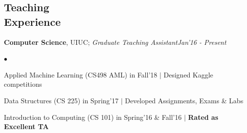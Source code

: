 \documentclass[margin,line]{res}
\newenvironment{list2}{
  \begin{list}{$\bullet$}{%
      \setlength{\itemsep}{0in}
      \setlength{\parsep}{0in} \setlength{\parskip}{0in}
      \setlength{\topsep}{0in} \setlength{\partopsep}{0in} 
      \setlength{\leftmargin}{0.2in}}}{\end{list}}
\begin{document}
\begin{resume}
\section{\sc \large Teaching \\ Experience}
{\bf Computer Science}, UIUC; {\em Graduate Teaching Assistant}\hfill {\em Jan'16 - Present}\vspace*{-0.12in}\\
\begin{list2}
\item Applied Machine Learning (CS498 AML) in Fall'18 $|$ Designed Kaggle competitions 
\item Data Structures (CS 225) in Spring'17 $|$ Developed Assignments, Exams \& Labs
\item Introduction to Computing (CS 101) in Spring'16 \& Fall'16 $|$ \bf{Rated as Excellent TA}
\end{list2}



\end{resume}
\end{document}
